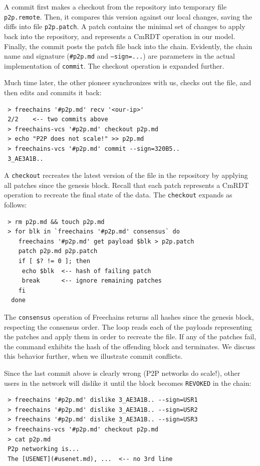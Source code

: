 \documentclass[12pt]{article}
\newcommand{\FC}       {Freechains\xspace}
\newcommand{\code}[1]  {\texttt{\footnotesize{#1}}}
\begin{document}
A commit first makes a checkout from the repository into temporary file
\code{p2p.remote}.
Then, it compares this version against our local changes, saving the diffs
into file \code{p2p.patch}.
A patch contains the minimal set of changes to apply back into the repository,
and represents a CmRDT operation in our model.
Finally, the commit posts the patch file back into the chain.
Evidently, the chain name and signature (\code{\#p2p.md} and \code{--sign=...})
are parameters in the actual implementation of \code{commit}.
The checkout operation is expanded further.

Much time later, the other pioneer synchronizes with us, checks out the file,
and then edits and commits it back:

{\footnotesize
\begin{verbatim}
 > freechains '#p2p.md' recv '<our-ip>'
 2/2    <-- two commits above
 > freechains-vcs '#p2p.md' checkout p2p.md
 > echo "P2P does not scale!" >> p2p.md
 > freechains-vcs '#p2p.md' commit --sign=320B5..
 3_AE3A1B..
\end{verbatim}
}

A \code{checkout} recreates the latest version of the file in the repository by
applying all patches since the genesis block.
Recall that each patch represents a CmRDT operation to recreate the final state
of the data.
The \code{checkout} expands as follows:

{\footnotesize
\begin{verbatim}
 > rm p2p.md && touch p2p.md
 > for blk in `freechains '#p2p.md' consensus` do
    freechains '#p2p.md' get payload $blk > p2p.patch
    patch p2p.md p2p.patch
    if [ $? != 0 ]; then
     echo $blk  <-- hash of failing patch
     break      <-- ignore remaining patches
    fi
  done
\end{verbatim}
}

The \code{consensus} operation of \FC returns all hashes since
the genesis block, respecting the consensus order.
The loop reads each of the payloads representing the patches and apply them in
order to recreate the file.
If any of the patches fail, the command exhibits the hash of the offending
block and terminates.
We discuss this behavior further, when we illustrate commit conflicts.

Since the last commit above is clearly wrong (P2P networks do scale!), other
users in the network will dislike it until the block becomes
\code{REVOKED} in the chain: %

{\footnotesize
\begin{verbatim}
 > freechains '#p2p.md' dislike 3_AE3A1B.. --sign=USR1
 > freechains '#p2p.md' dislike 3_AE3A1B.. --sign=USR2
 > freechains '#p2p.md' dislike 3_AE3A1B.. --sign=USR3
 > freechains-vcs '#p2p.md' checkout p2p.md
 > cat p2p.md
 P2p networking is...
 The [USENET](#usenet.md), ...  <-- no 3rd line
\end{verbatim}
}
\end{document}
